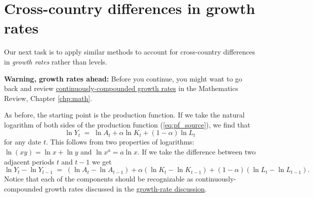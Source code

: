 %


\section{Cross-country differences in growth rates}

Our next task is to apply similar methods to account for cross-country differences in \emph{growth rates} rather than levels.

\textbf{Warning, growth rates ahead:} Before you continue, you might want to go back and review
\hyperref[sec:growth_math_cc]{continuously-compounded growth rates}
in the Mathematics Review, Chapter \ref{chp:math}.

As before, the starting point is the production function.
If we take the natural logarithm of both sides of the production function (\ref{eq:pf_source}),
we find that
\[
    \ln Y_t \;=\;  \ln A_t + \alpha \ln K_t
            + (1-\alpha) \ln L_t
\]
for any date $t$.
This follows from two properties of logarithms:  $ \ln (xy) = \ln x + \ln y$
and $\ln x^a = a \ln x$.
If we take the difference between two adjacent periods $t$ and $t-1$ we get
\[
    \ln Y_t -  \ln Y_{t-1} \;=\;  (\ln A_t - \ln A_{t-1}) + \alpha (\ln K_t-\ln K_{t-1})
            + (1-\alpha) (\ln L_t - \ln L_{t-1}).
\]
Notice that each of the components should be recognizable as continuously-compounded   growth rates discussed in the \hyperref[sec:growth_math_cc]{growth-rate discussion}.

